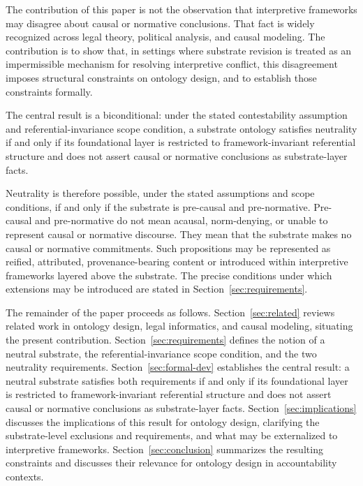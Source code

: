 The contribution of this paper is not the observation that
interpretive frameworks may disagree about causal or normative
conclusions.
That fact is widely recognized across legal theory,
political analysis, and causal modeling.
The contribution is to show that,
in settings where substrate revision is treated as
an impermissible mechanism for resolving interpretive conflict,
this disagreement imposes
structural constraints on ontology design,
and to establish those constraints formally.

The central result is a biconditional:
under the stated contestability assumption and referential-invariance
scope condition, a substrate ontology satisfies neutrality if and only if
its foundational layer is restricted to framework-invariant referential
structure and does not assert causal or normative conclusions as
substrate-layer facts.

Neutrality is therefore possible,
under the stated assumptions and scope conditions,
if and only if the substrate is pre-causal and pre-normative.
Pre-causal and pre-normative do not mean acausal,
norm-denying, or unable to represent causal or normative discourse.
They mean that the substrate makes no causal or normative commitments.
Such propositions may be represented as reified, attributed,
provenance-bearing content or introduced within interpretive frameworks
layered above the substrate.
The precise conditions under which extensions may be introduced
are stated in Section~\ref{sec:requirements}.

The remainder of the paper proceeds as follows.
Section~\ref{sec:related} reviews related work in ontology design,
legal informatics, and causal modeling, situating the present contribution.
Section~\ref{sec:requirements} defines the notion of a neutral substrate,
the referential-invariance scope condition, and the two neutrality
requirements.
Section~\ref{sec:formal-dev} establishes the central result:
a neutral substrate satisfies both requirements if and only if
its foundational layer is restricted to framework-invariant
referential structure and
does not assert causal or normative conclusions as substrate-layer facts.
Section~\ref{sec:implications} discusses the implications of this result for ontology design,
clarifying the substrate-level exclusions and requirements,
and what may be externalized to interpretive frameworks.
Section~\ref{sec:conclusion} summarizes the resulting constraints
and discusses their relevance for ontology design in accountability contexts.
